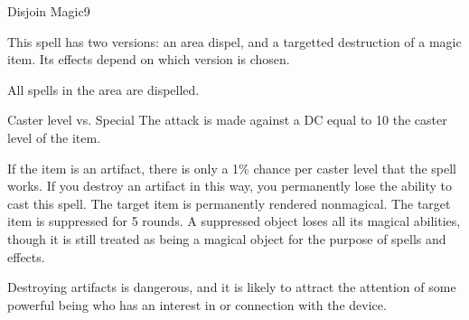 \begin{spellsection}{Disjoin Magic}{9}
\begin{spellheader}
\end{spellheader}
\begin{spellcontent}
    \begin{spelltargetinginfo}
        \spellspecial This spell has two versions: an area dispel, and a targetted destruction of a magic item. Its effects depend on which version is chosen.
    \end{spelltargetinginfo}
\end{spellcontent}
\begin{spellsubcontent}
    \begin{spelltargetinginfo}
    \end{spelltargetinginfo}
    \begin{spelleffects}
        \spelleffect All spells in the area are dispelled.
    \end{spelleffects}
\end{spellsubcontent}
\begin{spellsubcontent}
    \begin{spelltargetinginfo}
    \end{spelltargetinginfo}
    \begin{spelleffects}
        \begin{spellattack}{Caster level vs. Special}
            \spellspecial The attack is made against a DC equal to 10 \add the caster level of the item.

            If the item is an artifact, there is only a 1\% chance per caster level that the spell works. If you destroy an artifact in this way, you permanently lose the ability to cast this spell.
            \spellsuccess The target item is permanently rendered nonmagical.
            \spellfailure The target item is suppressed for 5 rounds. A suppressed object loses all its magical abilities, though it is still treated as being a magical object for the purpose of spells and effects.
        \end{spellattack}
    \end{spelleffects}
\end{spellsubcontent}
\begin{spellfooter}
    \spellnotes Destroying artifacts is dangerous, and it is likely to attract the attention of some powerful being who has an interest in or connection with the device.
\end{spellfooter}
\end{spellsection}

